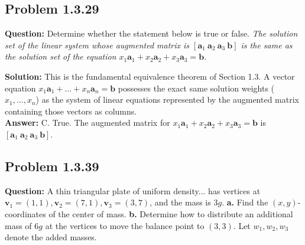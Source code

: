 \documentclass[11pt]{article}
\begin{document}
\subsection*{Problem 1.3.29}
\textbf{Question:} Determine whether the statement below is true or false. 
\textit{The solution set of the linear system whose augmented matrix is $[\mathbf{a}_1 \ \mathbf{a}_2 \ \mathbf{a}_3 \ \mathbf{b}]$ is the same as the solution set of the equation $x_1\mathbf{a}_1 + x_2\mathbf{a}_2 + x_3\mathbf{a}_3 = \mathbf{b}$.}

\textbf{Solution:}
This is the fundamental equivalence theorem of Section 1.3. A vector equation $x_1\mathbf{a}_1 + \dots + x_n\mathbf{a}_n = \mathbf{b}$ possesses the exact same solution weights ($x_1, \dots, x_n$) as the system of linear equations represented by the augmented matrix containing those vectors as columns.
\\
\textbf{Answer:} C. True. The augmented matrix for $x_1\mathbf{a}_1 + x_2\mathbf{a}_2 + x_3\mathbf{a}_3 = \mathbf{b}$ is $[\mathbf{a}_1 \ \mathbf{a}_2 \ \mathbf{a}_3 \ \mathbf{b}]$.


\subsection*{Problem 1.3.39}
\textbf{Question:} A thin triangular plate of uniform density... has vertices at $\mathbf{v}_1=(1,1), \mathbf{v}_2=(7,1), \mathbf{v}_3=(3,7)$, and the mass is $3g$.
\textbf{a.} Find the $(x,y)$-coordinates of the center of mass.
\textbf{b.} Determine how to distribute an additional mass of $6g$ at the vertices to move the balance point to $(3,3)$. Let $w_1, w_2, w_3$ denote the added masses.
\end{document}
